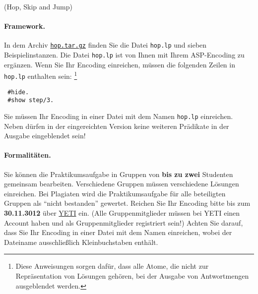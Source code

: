 \documentclass[a4paper,12pt,ngerman]{article}
\begin{document}
\begin{PraktikumsAufgabe}{1}{(Hop, Skip and Jump)}
\paragraph{Framework.}

\noindent
In dem Archiv 
\href{http://www.cs.uni-potsdam.de/wv/lehre/12WS/12-Antwortprog/hop.tar.gz}{\texttt{hop.tar.gz}}
finden Sie die Datei \texttt{hop.lp} und sieben Beispielinstanzen.
Die Datei \texttt{hop.lp} ist von Ihnen mit Ihrem ASP-Encoding zu ergänzen.
Wenn Sie Ihr Encoding einreichen,
müssen die folgenden Zeilen in \texttt{hop.lp} enthalten sein:%
\footnote{Diese Anweisungen sorgen dafür, dass alle Atome, die nicht zur Repräsentation von Lösungen gehören, bei der Ausgabe von Antwortmengen ausgeblendet werden.}%
\vspace{-1.5mm}
\begin{verbatim}
 #hide.
 #show step/3.
\end{verbatim}
\vspace{-1mm}
{\small\sf Sie m\"ussen Ihr Encoding in einer Datei mit dem Namen \texttt{hop.lp}
           einreichen.
           Neben  d\"urfen in der eingereichten Version keine weiteren
           Pr\"adikate in der Ausgabe eingeblendet sein!}

\noindent


\noindent

\paragraph{Formalitäten.}
%
Sie können die Praktikumsaufgabe in Gruppen von \textbf{bis zu zwei} Studenten gemeinsam bearbeiten.
Verschiedene Gruppen müssen verschiedene Lösungen einreichen.
Bei Plagiaten wird die Praktikumsaufgabe für alle beteiligten Gruppen als ``nicht bestanden'' gewertet.
Reichen Sie Ihr Encoding bitte bis zum \textbf{30.11.3012} %
über %
\href{http://yeti.haiti.cs.uni-potsdam.de/student/showPractical.do?practicalId=36}{YETI} %
ein.
(Alle Gruppenmitglieder müssen bei YETI einen Account haben und als 
 Gruppenmitglieder registriert sein!)
Achten Sie darauf, dass Sie Ihr Encoding in einer Datei mit dem Namen  einreichen,
wobei der Dateiname ausschließlich Kleinbuchstaben enthält.


\end{PraktikumsAufgabe}
\end{document}
